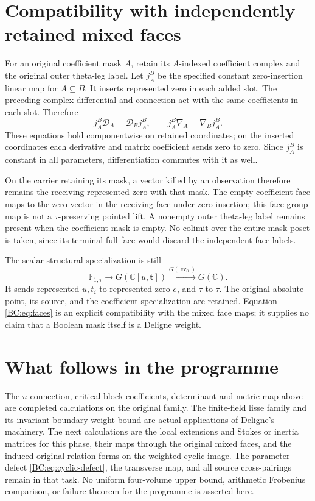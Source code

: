 \documentclass[11pt,a4paper]{article}
\newcommand{\C}{\mathbb C}
\begin{document}
\section{Compatibility with independently retained mixed faces}

For an original coefficient mask $A$, retain its $A$-indexed coefficient
complex and the original outer theta-leg label.  Let
$j_A^B$ be the specified constant zero-insertion linear map for
$A\subseteq B$.  It inserts represented zero in each added slot.
The preceding complex differential and connection act with the same
coefficients in each slot.  Therefore
\begin{equation}
 j_A^B\mathcal D_A=\mathcal D_Bj_A^B,
 \qquad j_A^B\nabla_A=\nabla_Bj_A^B.
 \label{BC:eq:faces}
\end{equation}
These equations hold componentwise on retained coordinates; on the
inserted coordinates each derivative and matrix coefficient sends zero
to zero.  Since $j_A^B$ is constant in all parameters, differentiation
commutes with it as well.

On the carrier retaining its mask, a vector killed by an observation
therefore remains the receiving represented zero with that mask.
The empty coefficient face maps to the zero vector in the receiving
face under zero insertion; this face-group map is not a
$\tau$-preserving pointed lift.  A nonempty outer theta-leg label
remains present when the coefficient mask is empty.  No colimit over
the entire mask poset is taken, since its terminal full face would
discard the independent face labels.

The scalar structural specialization is still
\[
 \mathbb F_{1,\tau}\longrightarrow G(\C[u,\mathbf t])
       \xrightarrow{G(\operatorname{ev}_0)}G(\C).
\]
It sends represented $u,t_i$ to represented zero $e$, and $\tau$ to
$\tau$.  The original absolute point, its source, and the coefficient
specialization are retained.  Equation \eqref{BC:eq:faces} is an explicit
compatibility with the mixed face maps; it supplies no claim that a
Boolean mask itself is a Deligne weight.

\section{What follows in the programme}

The $u$-connection, critical-block coefficients, determinant and metric
map above are completed calculations on the original family.  The
finite-field lisse family and its invariant boundary weight bound are
actual applications of Deligne's machinery.  The next calculations
are the local extensions and Stokes or inertia matrices for this phase,
their maps through the original mixed faces, and the induced original
relation forms on the weighted cyclic image.  The parameter defect
\eqref{BC:eq:cyclic-defect}, the transverse map, and all source
cross-pairings remain in that task.  No uniform four-volume upper bound,
arithmetic Frobenius comparison, or failure theorem for the programme
is asserted here.
\end{document}
